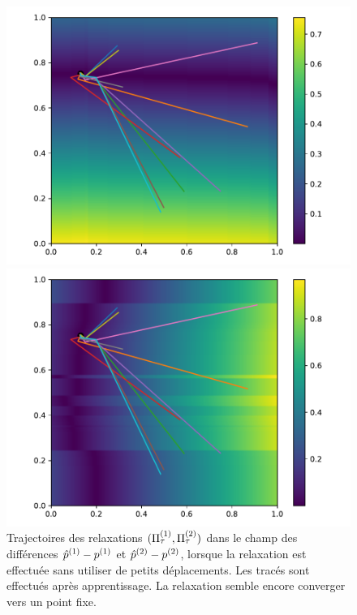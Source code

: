 \documentclass[../main]{subfiles}
\begin{document}
\begin{figure}
\begin{minipage}{0.5\textwidth}
\includegraphics[width=\textwidth]{champ_X_009}
\end{minipage}
\begin{minipage}{0.5\textwidth}
\includegraphics[width=\textwidth]{champ_Y_009}
\end{minipage}
\caption{Trajectoires des relaxations $(\Pi^{({1})}_{\tau},\Pi^{({2})}_\tau)$ dans le champ des différences ${\hat{p}}^{({1})} - p^{({1})}$ et ${\hat{p}}^{({2})} - p^{({2})}$, lorsque la relaxation est effectuée sans utiliser de petits déplacements. Les tracés sont effectués après apprentissage. La relaxation semble encore converger vers un point fixe.}
\label{fig:diff_nopas}
\end{figure}
\end{document}
